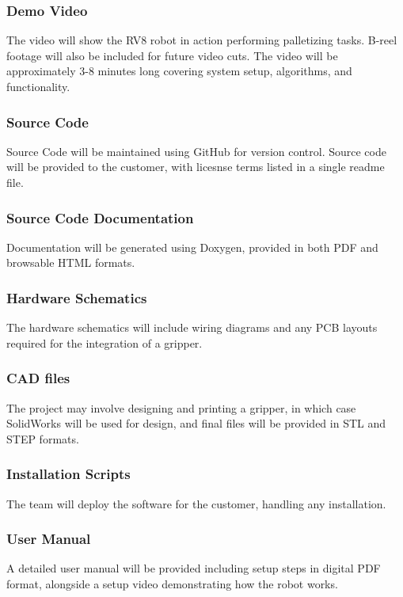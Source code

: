 \subsubsection{Demo Video}
The video will show the RV8 robot in action performing palletizing tasks. B-reel footage will also be included for future video cuts. The video will be approximately 3-8 minutes long covering system setup, algorithms, and functionality.
\subsubsection{Source Code}
Source Code will be maintained using GitHub for version control. Source code will be provided to the customer, with licesnse terms listed in a single readme file.

\subsubsection{Source Code Documentation}
Documentation will be generated using Doxygen, provided in both PDF and browsable HTML formats.

\subsubsection{Hardware Schematics}
The hardware schematics will include wiring diagrams and any PCB layouts required for the integration of a gripper. 

\subsubsection{CAD files}
The project may involve designing and printing a gripper, in which case SolidWorks will be used for design, and final files will be provided in STL and STEP formats.
\subsubsection{Installation Scripts}
The team will deploy the software for the customer, handling any installation.

\subsubsection{User Manual}
A detailed user manual will be provided including setup steps in digital PDF format, alongside a setup video demonstrating how the robot works. 